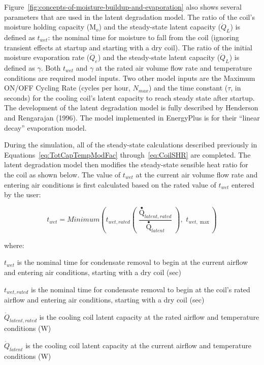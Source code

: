 Figure~\ref{fig:concepts-of-moisture-buildup-and-evaporation} also shows several parameters that are used in the latent degradation model. The ratio of the coil's moisture holding capacity (M\(_{o}\)) and the steady-state latent capacity (\({\dot{Q}_{L}}\)) is defined as \(t_{wet}\): the nominal time for moisture to fall from the coil (ignoring transient effects at startup and starting with a dry coil). The ratio of the initial moisture evaporation rate (\({\dot{Q}_{e}}\)) and the steady-state latent capacity (\({\dot{Q}_{L}}\)) is defined as \(\gamma\). Both \(t_{wet}\) and \(\gamma\) at the rated air volume flow rate and temperature conditions are required model inputs. Two other model inputs are the Maximum ON/OFF Cycling Rate (cycles per hour, \(N_{max}\)) and the time constant (\(\tau\), in seconds) for the cooling coil's latent capacity to reach steady state after startup. The development of the latent degradation model is fully described by Henderson and Rengarajan (1996). The model implemented in EnergyPlus is for their ``linear decay'' evaporation model.

During the simulation, all of the steady-state calculations described previously in Equations~\ref{eq:TotCapTempModFac} through~\ref{eq:CoilSHR} are completed. The latent degradation model then modifies the steady-state sensible heat ratio for the coil as shown below. The value of \(t_{wet}\) at the current air volume flow rate and entering air conditions is first calculated based on the rated value of \(t_{wet}\) entered by the user:

\begin{equation}
{t_{wet}} = Minimum\left( {{t_{wet,rated}}\left( {\frac{{{{\mathop Q\limits^ \bullet  }_{latent,rated}}}}{{{{\mathop Q\limits^ \bullet  }_{latent}}}}} \right),\,\,{t_{wet,\max }}} \right)
\end{equation}

where:

\(t_{wet}\) is the nominal time for condensate removal to begin at the current airflow and entering air conditions, starting with a dry coil (sec)

\(t_{wet,rated}\) is the nominal time for condensate removal to begin at the coil's rated airflow and entering air conditions, starting with a dry coil (sec)

\({\dot{Q}_{latent,rated}}\) is the cooling coil latent capacity at the rated airflow and temperature conditions (W)

\({\dot{Q}_{latent}}\) is the cooling coil latent capacity at the current airflow and temperature conditions (W)

